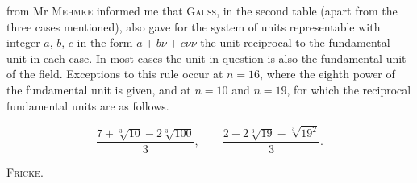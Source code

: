  from Mr \textsc{Mehmke} informed me that \textsc{Gauss}, in the
second table (apart from the three cases mentioned), also gave for the system
of units representable with integer $a$, $b$, $c$
in the form $a+b\nu+c\nu\nu$ the unit
reciprocal to the fundamental unit in each case. In most cases the unit in question is also the
fundamental unit of the field.
Exceptions to this rule occur at $n=16$, where the eighth power of the
fundamental unit is given, and at $n=10$ and $n=19$, for which the
reciprocal fundamental units are as follows.

\[
\frac{7+\sqrt[3]{10}-2\sqrt[3]{100}}{3}, \qquad
\frac{2+2\sqrt[3]{19}-\sqrt[3]{19^2}}{3}.
\]

\par\noindent\hfill\textsc{Fricke.}\par\endgroup
